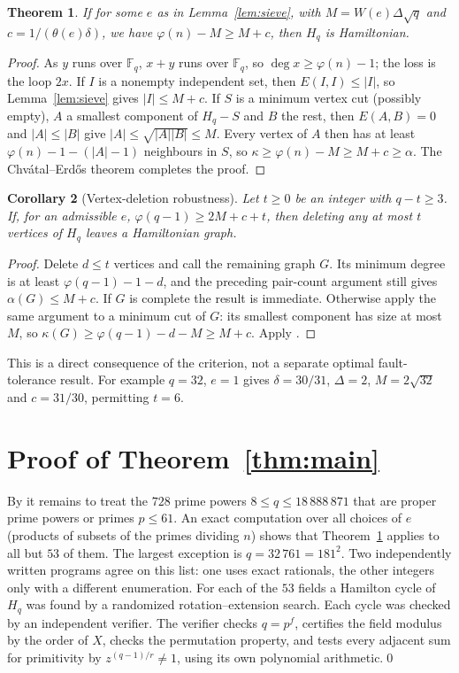\documentclass[11pt]{amsart}
\newtheorem{theorem}{Theorem}
\newtheorem{corollary}[theorem]{Corollary}
\newcommand{\F}{\mathbb{F}}
\begin{document}
\begin{theorem}\label{thm:crit}
If for some $e$ as in Lemma~\ref{lem:sieve}, with $M=W(e)\Delta\sqrt q$ and $c=1/(\theta(e)\delta)$, we have $\varphi(n)-M\ge M+c$, then $H_q$ is Hamiltonian.
\end{theorem}
\begin{proof}
As $y$ runs over $\F_q$, $x+y$ runs over $\F_q$, so $\deg x\ge\varphi(n)-1$; the loss is the loop $2x$. If $I$ is a nonempty independent set, then $E(I,I)\le|I|$, so Lemma~\ref{lem:sieve} gives $|I|\le M+c$. If $S$ is a minimum vertex cut (possibly empty), $A$ a smallest component of $H_q-S$ and $B$ the rest, then $E(A,B)=0$ and $|A|\le|B|$ give $|A|\le\sqrt{|A||B|}\le M$. Every vertex of $A$ then has at least $\varphi(n)-1-(|A|-1)$ neighbours in $S$, so $\kappa\ge\varphi(n)-M\ge M+c\ge\alpha$. The Chv\'atal--Erd\H{o}s theorem \cite{CE} completes the proof.
\end{proof}

\begin{corollary}[Vertex-deletion robustness]\label{cor:deletion}
Let $t\ge0$ be an integer with $q-t\ge3$. If, for an admissible $e$,
$\varphi(q-1)\ge2M+c+t$, then deleting any at most $t$ vertices of $H_q$
leaves a Hamiltonian graph.
\end{corollary}
\begin{proof}
Delete $d\le t$ vertices and call the remaining graph $G$. Its minimum
degree is at least $\varphi(q-1)-1-d$, and the preceding pair-count argument
still gives $\alpha(G)\le M+c$. If $G$ is complete the result is immediate.
Otherwise apply the same argument to a minimum cut of $G$: its smallest
component has size at most $M$, so
$\kappa(G)\ge\varphi(q-1)-d-M\ge M+c$. Apply \cite{CE}.
\end{proof}
This is a direct consequence of the criterion, not a separate optimal
fault-tolerance result. For example $q=32$, $e=1$ gives $\delta=30/31$,
$\Delta=2$, $M=2\sqrt{32}$ and $c=31/30$, permitting $t=6$.

\section{Proof of Theorem~\ref{thm:main}}
By \cite{She} it remains to treat the $728$ prime powers $8\le q\le18\,888\,871$ that are proper prime powers or primes $p\le61$. An exact computation over all choices of $e$ (products of subsets of the primes dividing $n$) shows that Theorem~\ref{thm:crit} applies to all but $53$ of them. The largest exception is $q=32\,761=181^2$. Two independently written programs agree on this list: one uses exact rationals, the other integers only with a different enumeration. For each of the $53$ fields a Hamilton cycle of $H_q$ was found by a randomized rotation--extension search. Each cycle was checked by an independent verifier. The verifier checks $q=p^f$, certifies the field modulus by the order of $X$, checks the permutation property, and tests every adjacent sum for primitivity by $z^{(q-1)/r}\ne1$, using its own polynomial arithmetic.\qed
\end{document}
